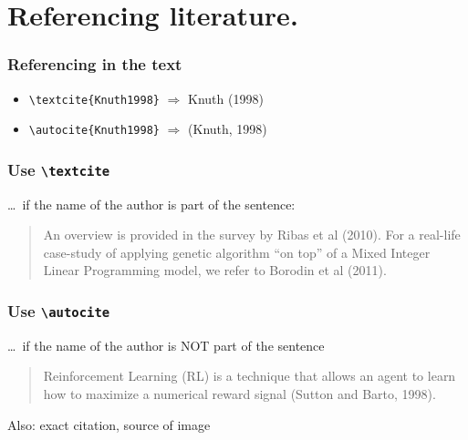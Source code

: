 \documentclass[aspectratio=169]{beamer}
\begin{document}
\section{Referencing literature.}

\begin{frame}[fragile]
  \frametitle{Referencing in the text}

  \begin{itemize}
    \item \verb|\textcite{Knuth1998}| \(\Rightarrow\) Knuth (1998)
    \item \verb|\autocite{Knuth1998}| \(\Rightarrow\) (Knuth, 1998)
  \end{itemize}
\end{frame}

\begin{frame}
  \frametitle{Use \texttt{\textbackslash{}textcite}}

  \ldots\ if the name of the author is part of the sentence:

  \bigskip

  \begin{quotation}
    An overview is provided in the survey by Ribas et al (2010). For a real-life case-study of applying genetic algorithm ``on top'' of a Mixed Integer Linear Programming model, we refer to Borodin et al (2011).
  \end{quotation}

\end{frame}

\begin{frame}
  \frametitle{Use \texttt{\textbackslash{}autocite}}

  \ldots\ if the name of the author is NOT part of the sentence

  \bigskip

  \begin{quotation}
    Reinforcement Learning (RL) is a technique that allows an agent to learn how to maximize a numerical reward signal (Sutton and Barto, 1998).
  \end{quotation}

  \bigskip

  Also: exact citation, source of image

\end{frame}


\end{document}
